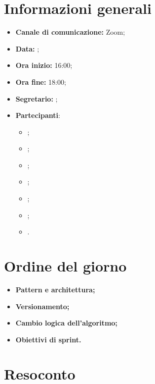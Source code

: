 \section{Informazioni generali}

\begin{itemize}

    \item \textbf{Canale di comunicazione:} Zoom;

    \item \textbf{Data:} \DataMeeting{};

    \item \textbf{Ora inizio:} 16:00;

    \item \textbf{Ora fine:} 18:00;

    \item \textbf{Segretario:} \ACapoRedazione{};

    \item \textbf{Partecipanti}: 
        \begin{itemize}
            \item \Daniele{};
            \item \Davide{};
            \item \Francesco{};
            \item \Giosue{};
            \item \Lucrezia{};
            \item \Matteo{};
            \item \Tommaso{}.
        \end{itemize}
\end{itemize}

\section{Ordine del giorno}

\begin{itemize}
    \item\textbf{Pattern e architettura;}
    \item\textbf{Versionamento;}
    \item\textbf{Cambio logica dell'algoritmo;}
    \item\textbf{Obiettivi di sprint.}
\end{itemize}
\newpage


\section{Resoconto}

